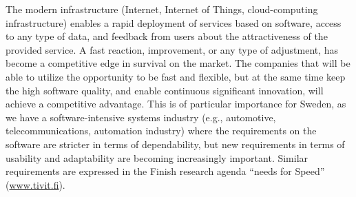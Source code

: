 \documentclass[12pt]{article}
\begin{document}
The modern infrastructure (Internet, Internet of Things, cloud-computing infrastructure) enables a rapid deployment of services based on software, access to any type of data, and feedback from users about the attractiveness of the provided service. A fast reaction, improvement, or any type of adjustment, has become a competitive edge in survival on the market. The companies that will be able to utilize the opportunity to be fast and flexible, but at the same time keep the high software quality, and enable continuous significant innovation, will achieve a competitive advantage. This is of particular importance for Sweden, as we have a software-intensive systems industry (e.g., automotive, telecommunications, automation industry) where the requirements on the software are stricter in terms of dependability, but new requirements in terms of usability and adaptability are becoming increasingly important. Similar requirements are expressed in the Finish research agenda ``needs for Speed'' ({\small \url{www.tivit.fi}}).

%
%
%
\end{document}
